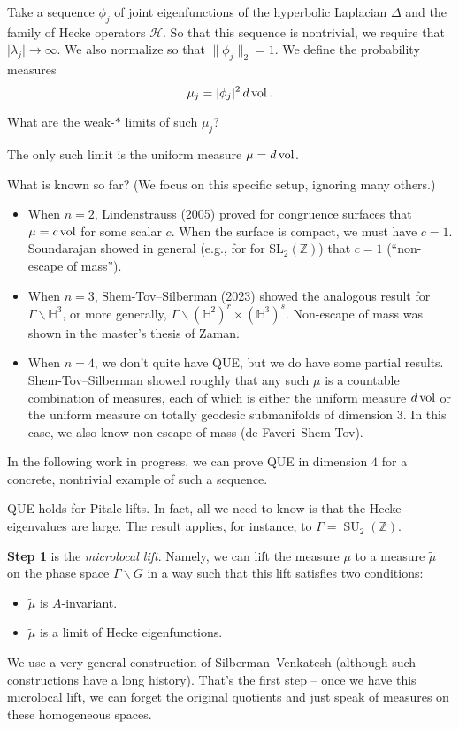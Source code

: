 \documentclass[reqno]{amsart} 
\begin{document}
Take a sequence $\phi_j$ of joint eigenfunctions of the hyperbolic Laplacian $\Delta$ and the family of Hecke operators $\mathcal{H}$.  So that this sequence is nontrivial, we require that $\lvert \lambda_j \rvert \rightarrow \infty$.  We also normalize so that $\lVert \phi_j \rVert_2 = 1$.  We define the probability measures
\begin{equation*}
  \mu_j = \lvert \phi_j \rvert^2 \, d \operatorname{vol}.
\end{equation*}
\begin{question}
  What are the weak-$\ast$ limits of such $\mu_j$?
\end{question}
\begin{conjecture}
  The only such limit is the uniform measure $\mu = d \operatorname{vol}$.
\end{conjecture}
What is known so far?  (We focus on this specific setup, ignoring many others.)
\begin{itemize}
\item When $n = 2$, Lindenstrauss (2005) proved for congruence surfaces that $\mu = c \operatorname{vol}$ for some scalar $c$.  When the surface is compact, we must have $c = 1$.  Soundarajan showed in general (e.g., for for $\mathrm{SL}_2(\mathbb{Z})$) that $c = 1$ (``non-escape of mass'').
\item When $n = 3$, Shem-Tov--Silberman (2023) showed the analogous result for $\Gamma \backslash \mathbb{H}^3$, or more generally, $\Gamma \backslash (\mathbb{H}^2)^r \times(\mathbb{H}^3)^s$.  Non-escape of mass was shown in the master's thesis of Zaman.
\item When $n = 4$, we don't quite have QUE, but we do have some partial results.  Shem-Tov--Silberman showed roughly that any such $\mu$ is a countable combination of measures, each of which is either the uniform measure $d \operatorname{vol}$ or the uniform measure on totally geodesic submanifolds of dimension $3$.  In this case, we also know non-escape of mass (de Faveri--Shem-Tov).
\end{itemize}

In the following work in progress, we can prove QUE in dimension $4$ for a concrete, nontrivial example of such a sequence.
\begin{theorem}
  QUE holds for Pitale lifts.  In fact, all we need to know is that the Hecke eigenvalues are large.  The result applies, for instance, to $\Gamma = \operatorname{SU}_2(\mathbb{Z})$.
\end{theorem}

\textbf{Step 1} is the \emph{microlocal lift}.  Namely, we can lift the measure $\mu$ to a measure $\tilde{\mu}$ on the phase space $\Gamma \backslash G$ in a way such that this lift satisfies two conditions:
\begin{itemize}
\item $\tilde{\mu}$ is $A$-invariant.
\item $\tilde{\mu}$ is a limit of Hecke eigenfunctions.
\end{itemize}
We use a very general construction of Silberman--Venkatesh (although such constructions have a long history).  That's the first step -- once we have this microlocal lift, we can forget the original quotients and just speak of measures on these homogeneous spaces.
\end{document}
